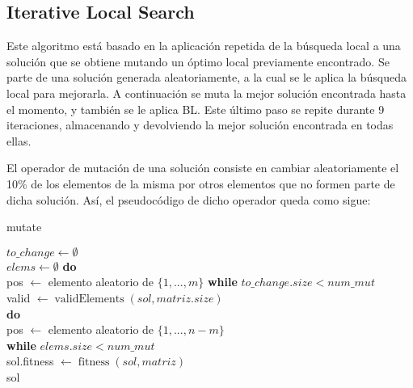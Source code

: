 \documentclass[11pt,a4paper]{article}
\begin{document}
\subsection{Iterative Local Search}

Este algoritmo está basado en la aplicación repetida de la búsqueda local a una solución que se obtiene mutando un óptimo local previamente encontrado. Se parte de una solución generada aleatoriamente, a la cual se le aplica la búsqueda local para mejorarla. A continuación se muta la mejor solución encontrada hasta el momento, y también se le aplica BL. Este último paso se repite durante 9 iteraciones, almacenando y devolviendo la mejor solución encontrada en todas ellas.

El operador de mutación de una solución consiste en cambiar aleatoriamente el 10\% de los elementos de la misma por otros elementos que no formen parte de dicha solución. Así, el pseudocódigo de dicho operador queda como sigue: \\

\begin{algorithm}[H]
	\DontPrintSemicolon
	\caption{{\sc mutate}}
	$to\_change \gets \emptyset$\\
	$elems \gets \emptyset$
	\textbf{do}\\
		pos $\leftarrow$ elemento aleatorio de $\{1,...,m\}$ 
	\textbf{while}	$to\_change.size < num\_mut$\\
	
	valid $\leftarrow \operatorname{validElements}(sol,matriz.size)$ \\
	\textbf{do}\\
	pos $\leftarrow$ elemento aleatorio de $\{1,...,n-m\}$ \\
	\textbf{while}	$elems.size < num\_mut$\\
	sol.fitness $\leftarrow \operatorname{fitness}(sol,matriz)$\\
	
	\Return sol
\end{algorithm}
\end{document}
